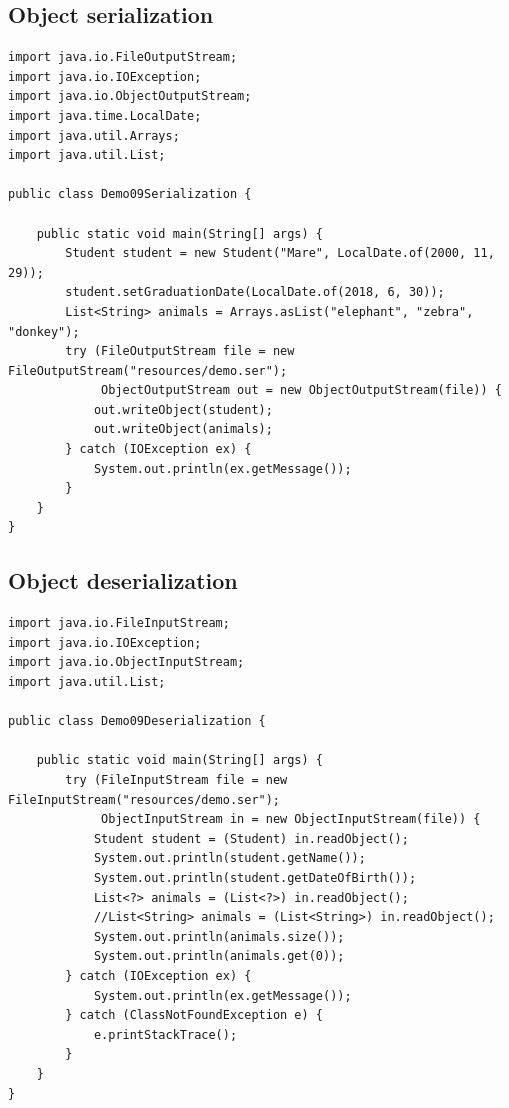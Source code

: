\documentclass{tstextbook}
\begin{document}
\subsection{Object serialization}

\begin{lstlisting}
import java.io.FileOutputStream;
import java.io.IOException;
import java.io.ObjectOutputStream;
import java.time.LocalDate;
import java.util.Arrays;
import java.util.List;

public class Demo09Serialization {

	public static void main(String[] args) {
		Student student = new Student("Mare", LocalDate.of(2000, 11, 29));
		student.setGraduationDate(LocalDate.of(2018, 6, 30));
		List<String> animals = Arrays.asList("elephant", "zebra", "donkey");
		try (FileOutputStream file = new FileOutputStream("resources/demo.ser");
		     ObjectOutputStream out = new ObjectOutputStream(file)) {
			out.writeObject(student);
			out.writeObject(animals);
		} catch (IOException ex) {
			System.out.println(ex.getMessage());
		}
	}
}
\end{lstlisting}


\subsection{Object deserialization}

\begin{lstlisting}
import java.io.FileInputStream;
import java.io.IOException;
import java.io.ObjectInputStream;
import java.util.List;

public class Demo09Deserialization {

	public static void main(String[] args) {
		try (FileInputStream file = new FileInputStream("resources/demo.ser");
		     ObjectInputStream in = new ObjectInputStream(file)) {
			Student student = (Student) in.readObject();
			System.out.println(student.getName());
			System.out.println(student.getDateOfBirth());
			List<?> animals = (List<?>) in.readObject();
			//List<String> animals = (List<String>) in.readObject();
			System.out.println(animals.size());
			System.out.println(animals.get(0));
		} catch (IOException ex) {
			System.out.println(ex.getMessage());
		} catch (ClassNotFoundException e) {
			e.printStackTrace();
		}
	}
}
\end{lstlisting}


\end{document}
